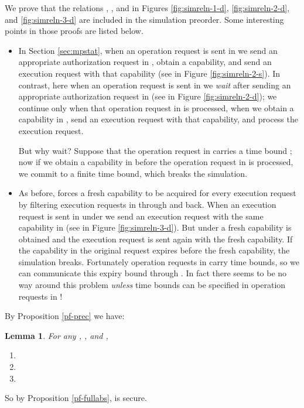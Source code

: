 \documentclass[10pt]{article}
\newtheorem{lemma}[theorem]{Lemma}
\begin{document}
We prove that the relations , , and  in Figures \ref{fig:simreln-1-d}, \ref{fig:simreln-2-d}, and \ref{fig:simreln-3-d} are included in the simulation preorder. Some interesting points in those proofs are listed below. 
\begin{itemize}
\item In Section \ref{sec:mpstat}, when an operation request is sent in  we send an appropriate authorization request in , obtain a capability, and send an execution request with that capability (see  in Figure \ref{fig:simreln-2-s}). In contrast, here when an operation request is sent in  we \emph{wait} after sending an appropriate authorization request in  (see  in Figure \ref{fig:simreln-2-d}); we continue only when that operation request in  is processed, when we obtain a capability in , send an execution request with that capability, and process the execution request. 

But why wait? Suppose that the operation request in  carries a time bound ; now if we obtain a capability in  before the operation request in  is processed, we commit to a finite time bound, which breaks the simulation. 
\item As before,  forces a fresh capability to be acquired for every execution request by filtering execution requests in  through  and back. When an execution request is sent in  under  we  send an execution request with the same capability in  (see  in Figure \ref{fig:simreln-3-d}). But under  a fresh capability is obtained and the execution request is sent again with the fresh capability. If the capability in the original request expires before the fresh capability, the simulation breaks. Fortunately operation requests in  carry time bounds, so we can communicate this expiry bound through . In fact there seems to be no way around this problem \emph{unless} time bounds can be specified in operation requests in !
\end{itemize}
By Proposition \ref{pf-prec} we have:
\begin{lemma}\label{dynamic-lemma} For any , , and ,
\begin{enumerate}
\item 
\par 
\item 
\par 
\item 
\par 
\end{enumerate}
\end{lemma}
So by Proposition \ref{pf-fullabs},  is secure. 
\end{document}
